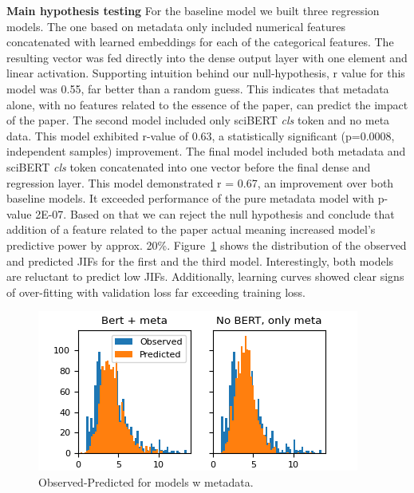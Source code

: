 \documentclass[11pt]{article}
\begin{document}
\textbf{Main hypothesis testing} For the baseline model we built three regression models. The one based on metadata only included numerical features concatenated with learned embeddings for each of the categorical features. The resulting vector was fed directly into the dense output layer with one element and linear activation.  Supporting intuition behind our null-hypothesis, r value for this model was 0.55, far better than a random guess. This indicates that metadata alone, with no features related to the essence of the paper, can predict the impact of the paper. The second model included only sciBERT \textit{cls} token and no meta data. This model exhibited r-value of 0.63, a statistically significant (p=0.0008, independent samples) improvement. The final model included both metadata and sciBERT \textit{cls} token concatenated into one vector before the final dense and regression layer. This model demonstrated r = 0.67, an improvement over both baseline models. It exceeded performance of the pure metadata model with p-value 2E-07. Based on that we can reject the null hypothesis and conclude that addition of a feature related to the paper actual meaning increased model's predictive power by approx. 20\%.
Figure~\ref{fig:meta_no_meta} shows the distribution of the observed and predicted JIFs for the first and the third model. Interestingly, both models are reluctant to predict low JIFs. Additionally, learning curves showed clear signs of over-fitting with validation loss far exceeding training loss. 
\begin{figure}
	\includegraphics[width= \columnwidth]{./Images/meta no meta.png}
	\caption{Observed-Predicted for models w metadata.}
	\label{fig:meta_no_meta}
\end{figure}
\end{document}
